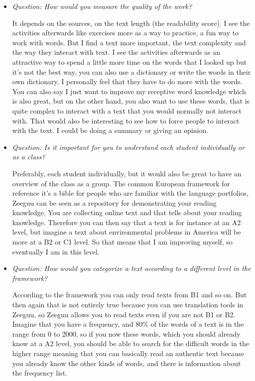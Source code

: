 \begin{itemize}
	\item \textit{Question: How would you measure the quality of the work?}
	
It depends on the sources, on the text length (the readability score). I see the activities afterwards like exercises more as a way to practice, a fun way to work with words. But I find a text more important, the text complexity and the way they interact with text. I see the activities afterwards as an attractive way to spend a little more time on the words that I looked up but it's not the best way, you can also use a dictionary or write the words in their own dictionary. I personally feel that they have to do more with the words. You can also say I just want to improve my receptive word knowledge which is also great, but on the other hand, you also want to use these words, that is quite complex to interact with a text that you would normally not interact with. That would also be interesting to see how to force people to interact with the text. I could be doing a summary or giving an opinion. 

	\item \textit{Question: Is it important for you to understand each student individually or as a class?}
	
Preferably, each student individually, but it would also be great to have an overview of the class as a group. The common European framework for reference it's a bible for people who are familiar with the language portfolios, Zeeguu can be seen as a repository for demonstrating your reading knowledge. You are collecting online text and that tells about your reading knowledge. Therefore you can then say that a text is for instance at an A2 level, but imagine a text about environmental problems in America will be more at a B2 or C1 level. So that means that I am improving myself, so eventually I am in this level. 

	\item \textit{Question: How would you categorize a text according to a different level in the framework?}
	
According to the framework you can only read texts from B1 and so on. But then again that is not entirely true because you can use translation tools in Zeeguu, so Zeeguu allows you to read texts even if you are not B1 or B2. 
Imagine that you have a frequency, and 80\% of the words of a text is in the range from 0 to 2000, so if you now these words, which you should already know at a A2 level, you should be able to search for the difficult words in the higher range meaning that you can basically read an authentic text because you already know the other kinds of words, and there is information about the frequency list.


\end{itemize}
